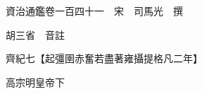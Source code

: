 










 


 
 


 

  
  
  
  
  





  
  
  
  
  
 
  

  

  
  
  



  

 
 

  
   




  

  
  


  　　資治通鑑卷一百四十一　宋　司馬光　撰

　　胡三省　音註

　　齊紀七【起彊圉赤奮若盡著雍攝提格凡二年】

　　高宗明皇帝下

